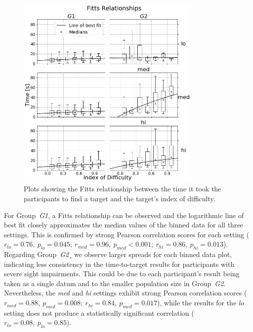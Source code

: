 \documentclass[acmsmall]{acmart}
\begin{document}
\begin{figure}
  \centering
  \includegraphics[width=0.8\textwidth]{figures/fitts_fit.png}
  \caption{Plots showing the Fitts relationship between the time it took the participants to find a target and the target's index of difficulty. }\label{fig:fitts-results}
\end{figure}

For Group~\textit{G1}, a Fitts relationship can be observed and the logarithmic line of best fit closely approximates the median values of the binned data for all three settings. 
This is confirmed by strong Pearson correlation scores for each setting ($r_{lo} = 0.76,~p_{lo} = 0.045;~r_{med} = 0.96,~p_{med}<0.001;~r_{hi} = 0.86,~p_{hi} = 0.013$).
Regarding Group~\textit{G2}¸ we observe larger spreads for each binned data plot, indicating less consistency in the time-to-target results for participants with severe sight impairments.
This could be due to each participant's result being taken as a single datum and to the smaller population size in Group~\textit{G2}.
Nevertheless, the \textit{med} and \textit{hi} settings exhibit strong Pearson correlation scores ($r_{med} = 0.88,~p_{med} = 0.008;~r_{hi} = 0.84,~p_{med} = 0.017$), while the results for the \textit{lo} setting does not produce a statistically significant correlation ($r_{lo} = 0.08,~p_{lo} = 0.85$).
\end{document}
